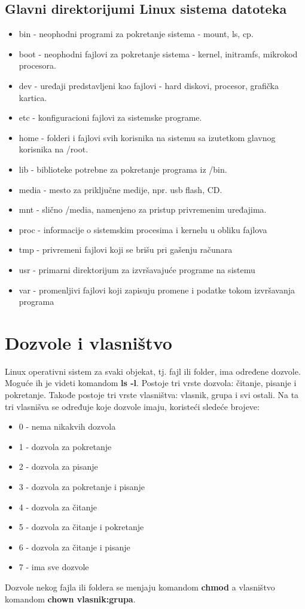 \documentclass[a4paper,14pt]{article}
\begin{document}
\subsection{Glavni direktorijumi Linux sistema datoteka}
\begin{itemize}
\item bin - neophodni programi za pokretanje sistema - mount, ls, cp.
\item boot - neophodni fajlovi za pokretanje sistema - kernel, initramfs, mikrokod procesora.
\item dev - uređaji predstavljeni kao fajlovi - hard diskovi, procesor, grafička kartica.
\item etc - konfiguracioni fajlovi za sistemske programe.
\item home - folderi i fajlovi svih korisnika na sistemu sa izutetkom glavnog korisnika na /root.
\item lib - biblioteke potrebne za pokretanje programa iz /bin.
\item media - mesto za priključne medije, npr. usb flash, CD.
\item mnt - slično /media, namenjeno za pristup privremenim uređajima.
\item proc - informacije o sistemskim procesima i kernelu u obliku fajlova
\item tmp - privremeni fajlovi koji se brišu pri gašenju računara
\item usr - primarni direktorijum za izvršavajuće programe na sistemu
\item var - promenljivi fajlovi koji zapisuju promene i podatke tokom izvršavanja programa
\end{itemize}
\newpage

\section{Dozvole i vlasništvo}
Linux operativni sistem za svaki objekat, tj. fajl ili folder, ima određene dozvole. Moguće ih je videti komandom \textbf{ls -l}. Postoje tri vrste dozvola: čitanje, pisanje i pokretanje. Takođe postoje tri vrste vlasništva: vlasnik, grupa i svi ostali. Na ta tri vlasnišva se određuje koje dozvole imaju, koristeći sledeće brojeve:
\begin{itemize}
\item 0 - nema nikakvih dozvola
\item 1 - dozvola za pokretanje
\item 2 - dozvola za pisanje
\item 3 - dozvola za pokretanje i pisanje
\item 4 - dozvola za čitanje
\item 5 - dozvola za čitanje i pokretanje
\item 6 - dozvola za čitanje i pisanje
\item 7 - ima sve dozvole
\end{itemize}
Dozvole nekog fajla ili foldera se menjaju komandom \textbf{chmod} a vlasništvo komandom \textbf{chown vlasnik:grupa}.
\end{document}
